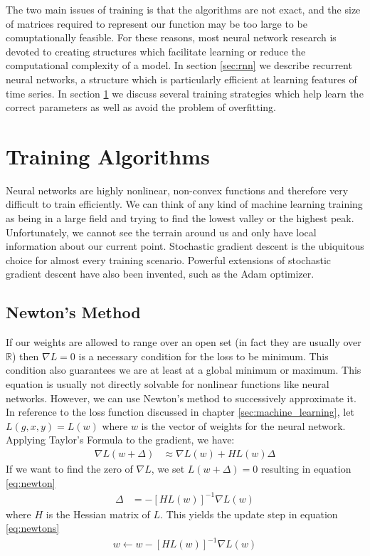 The two main issues of training is that the algorithms are not exact, and the size of matrices required to represent our function may be too large to be comuptationally feasible. For these reasons, most neural network research is devoted to creating structures which facilitate learning or reduce the computational complexity of a model.  In section \ref{sec:rnn} we describe recurrent neural networks, a structure which is particularly efficient at learning features of time series.  In section \ref{sec:training} we discuss several training strategies which help learn the correct parameters as well as avoid the problem of overfitting.

\section{Training Algorithms}\label{sec:training}
Neural networks are highly nonlinear, non-convex functions and therefore very difficult to train efficiently.  We can think of any kind of machine learning training as being in a large field and trying to find the lowest valley or the highest peak.  Unfortunately, we cannot see the terrain around us and only have local information about our current point.  Stochastic gradient descent is the ubiquitous choice for almost every training scenario.  Powerful extensions of stochastic gradient descent have also been invented, such as the Adam optimizer.

\subsection{Newton's Method}
If our weights are allowed to range over an open set (in fact they are usually over $\mathbb{R}$) then $\nabla L = 0$ is a necessary condition for the loss to be minimum.  This condition also guarantees we are at least at a global minimum or maximum.  This equation is usually not directly solvable for nonlinear functions like neural networks.  However, we can use Newton's method to successively approximate it.  In reference to the loss function discussed in chapter \ref{sec:machine_learning}, let $L(g,x,y) = L(w)$ where $w$ is the vector of weights for the neural network.  Applying Taylor's Formula to the gradient, we have:
\begin{align}
\nabla L(w+\Delta) &\approx \nabla L(w) + HL(w)\Delta
\end{align}
If we want to find the zero of $\nabla L$, we set $L(w+\Delta) = 0$ resulting in equation \ref{eq:newton}
\begin{align}\label{eq:newton}
\Delta &= -[HL(w)]^{-1}\nabla L(w)
\end{align}
where $H$ is the Hessian matrix of $L$.  This yields the update step in equation \ref{eq:newtons}
\begin{align}\label{eq:newtons}
w \leftarrow w - [HL(w)]^{-1}\nabla L(w)
\end{align}

